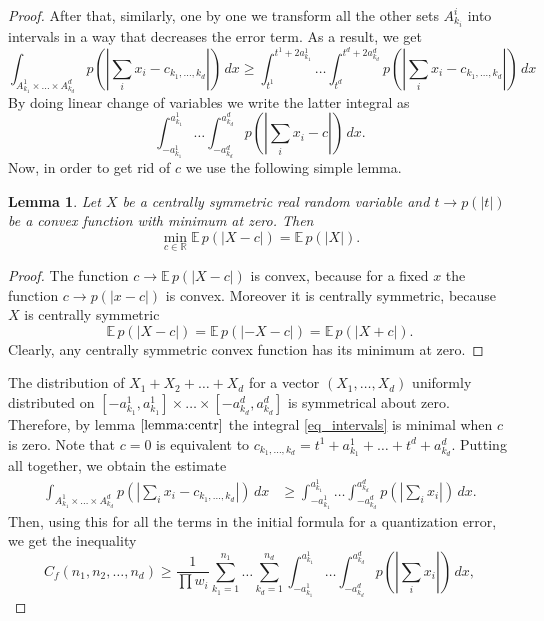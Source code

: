 \documentclass{amsart}
\newtheorem{lemma}[theorem]{Lemma}
\theoremstyle{remark}
\numberwithin{equation}{section}
\numberwithin{figure}{section}
\def\E{\mathbb{E}\,}
\begin{document}
\begin{proof}
	After that, similarly, one by one we transform all the other sets $A_{k_i}^i$ into intervals in a way that decreases the error term. As a result, we get
	\[
	\int_{A_{k_1}^1\times\ldots \times A_{k_d}^d} p(|\sum_i x_i -c_{k_1, \ldots, k_d}|)\, d x
	\geq
	\int_{t^1}^{t^1 + 2 a_{k_1}^1}\ldots \int_{t^d}^{t^d + 2 a_{k_d}^d} p(|\sum_i x_i -c_{k_1, \ldots, k_d}|)\, d x
	\]
	By doing linear change of variables we write the latter integral as
	\begin{equation}
	\label{eq_intervals}
	\int_{-a_{k_1}^1}^{a_{k_1}^1}\ldots \int_{-a_{k_d}^d}^{a_{k_d}^d} p(|\sum_i x_i - c|)\, d x.
	\end{equation}
	Now, in order to get rid of $c$ we use the following simple lemma.
	\begin{lemma}
		\label{lemma:centr}
		Let $X$ be a centrally symmetric real random variable and $t \to p(|t|)$ be a convex function with minimum at zero. Then 
		\[
		\min_{c\in \mathbb{R}} \E p(|X-c|) = \E p(|X|).
		\]
	\end{lemma}	
	\begin{proof}
		The function $c \to \E p(|X-c|)$ is convex, because for a fixed $x$ the function $c \to p(|x-c|)$ is convex. Moreover it is centrally symmetric, because $X$ is centrally symmetric
		\[
		\E p(|X-c|) = \E p(|-X-c|) = \E p(|X+c|).
		\]
		Clearly, any centrally symmetric convex function has its minimum at zero.
	\end{proof}	
	The distribution of $X_1+X_2 + \ldots + X_d$ for a vector $(X_1, \ldots, X_d)$ uniformly distributed on $[-a_{k_1}^1, a_{k_1}^1] \times \ldots \times [-a_{k_d}^d, a_{k_d}^d]$ is symmetrical about zero. Therefore, by lemma $\ref{lemma:centr}$ the integral \eqref{eq_intervals} is minimal when $c$ is zero. Note that $c = 0$ is equivalent to $c_{k_1, \ldots, k_d} = t^1+a_{k_1}^1+ \ldots  + t^d + a_{k_d}^d$. Putting all together, we obtain the estimate
	\begin{align*}
		\int_{A_{k_1}^1\times\ldots \times A_{k_d}^d} p(|\sum_i x_i -c_{k_1, \ldots, k_d}|)\, d x
		&\geq  \int_{-a_{k_1}^1}^{a_{k_1}^1}\ldots \int_{-a_{k_d}^d}^{a_{k_d}^d} p(|\sum_i x_i|)\, d x.
	\end{align*}
	Then, using this for all the terms in the initial formula for a quantization error, we get the inequality
	\[
	C_f(n_1, n_2, \ldots, n_d) \geq \frac{1}{\prod w_i} \sum_{k_1=1}^{n_1}\ldots \sum_{k_d=1}^{n_d} \int_{-a_{k_1}^1}^{a_{k_1}^1} \ldots \int_{-a_{k_d}^d}^{a_{k_d}^d} p(|\sum_i x_i|) \, dx,
\]
\end{proof}
\end{document}
